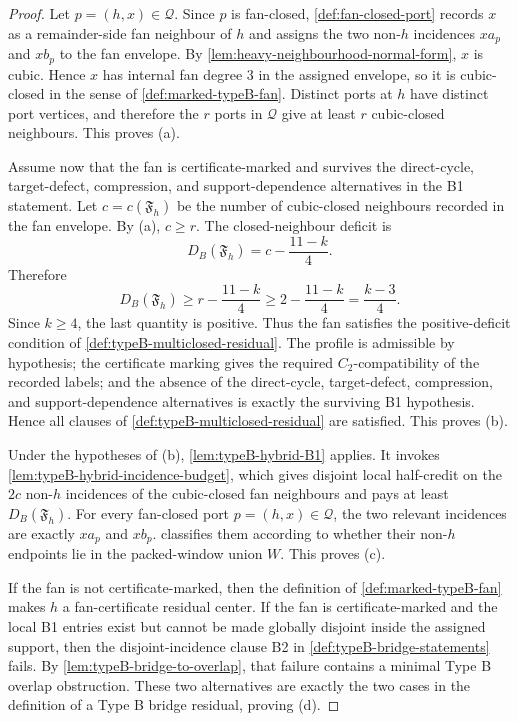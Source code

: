 \documentclass[11pt]{article}
\begin{document}
\begin{proof}
Let \(p=(h,x)\in\mathcal Q\).  Since \(p\) is fan-closed,
\cref{def:fan-closed-port} records \(x\) as a remainder-side fan neighbour of
\(h\) and assigns the two non-\(h\) incidences \(xa_p\) and \(xb_p\) to the fan
envelope.  By \cref{lem:heavy-neighbourhood-normal-form}, \(x\) is cubic.
Hence \(x\) has internal fan degree \(3\) in the assigned envelope, so it is
cubic-closed in the sense of \cref{def:marked-typeB-fan}.  Distinct ports at
\(h\) have distinct port vertices, and therefore the \(r\) ports in
\(\mathcal Q\) give at least \(r\) cubic-closed neighbours.  This proves (a).

Assume now that the fan is certificate-marked and survives the direct-cycle,
target-defect, compression, and support-dependence alternatives in the B1 statement.
Let \(c=c(\mathfrak F_h)\) be the number of cubic-closed neighbours recorded in
the fan envelope.  By (a), \(c\ge r\).  The closed-neighbour deficit is
\[
D_B(\mathfrak F_h)=c-\frac{11-k}{4}.
\]
Therefore
\[
D_B(\mathfrak F_h)
\ge
r-\frac{11-k}{4}
\ge
2-\frac{11-k}{4}
=
\frac{k-3}{4}.
\]
Since \(k\ge4\), the last quantity is positive.  Thus the fan satisfies the
positive-deficit condition of \cref{def:typeB-multiclosed-residual}.  The
profile is admissible by hypothesis; the certificate marking gives the required
\(C_2\)-compatibility of the recorded labels; and the absence of the
direct-cycle, target-defect, compression, and support-dependence alternatives is
exactly the surviving B1 hypothesis.  Hence all clauses of
\cref{def:typeB-multiclosed-residual} are satisfied.  This proves (b).

Under the hypotheses of (b), \cref{lem:typeB-hybrid-B1} applies.  It invokes
\cref{lem:typeB-hybrid-incidence-budget}, which gives disjoint local half-credit
on the \(2c\) non-\(h\) incidences of the cubic-closed fan neighbours and pays
at least \(D_B(\mathfrak F_h)\).  For every fan-closed port
\(p=(h,x)\in\mathcal Q\), the two relevant incidences are exactly \(xa_p\) and
\(xb_p\).   classifies them according
to whether their non-\(h\) endpoints lie in the packed-window union \(W\).  This
proves (c).

If the fan is not certificate-marked, then the definition of
\cref{def:marked-typeB-fan} makes \(h\) a fan-certificate residual center.  If
the fan is certificate-marked and the local B1 entries exist but cannot be made
globally disjoint inside the assigned support, then the disjoint-incidence clause
B2 in \cref{def:typeB-bridge-statements} fails.  By
\cref{lem:typeB-bridge-to-overlap}, that failure contains a minimal Type B
overlap obstruction.  These two alternatives are exactly the two cases in the
definition of a Type B bridge residual, proving (d).
\end{proof}
\end{document}

